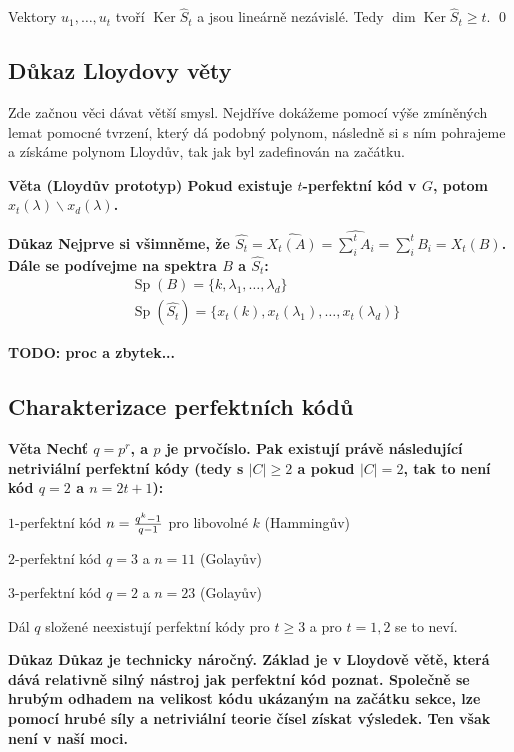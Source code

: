 \documentclass[a4paper,12pt,titlepage]{article}
\newcommand{\dk}{\smallskip\noindent\bf Důkaz\rm{} }
\newcommand{\vt}{\smallskip\noindent\bf Věta\rm{} }
\newcommand{\todo}[1]{\bf TODO: \rm#1}
\DeclareMathOperator{\Sp}{Sp}
\DeclareMathOperator{\Ker}{Ker}
\begin{document}
Vektory $u_1,\dots, u_t$ tvoří $\Ker \widehat S_t$ a jsou lineárně nezávislé. Tedy $\dim\Ker\widehat S_t \ge t$.
\qed

\subsection{Důkaz Lloydovy věty}

Zde začnou věci dávat větší smysl. Nejdříve dokážeme pomocí výše zmíněných lemat pomocné tvrzení, který dá podobný polynom, následně si s ním pohrajeme a získáme polynom Lloydův, tak jak byl zadefinován na začátku.

\vt (Lloydův prototyp) Pokud existuje $t$-perfektní kód v $G$, potom $x_t(\lambda)\backslash x_d(\lambda)$.

\dk Nejprve si všimněme, že $\widehat{S_t} = \widehat{X_t(A)} = \widehat{\sum_i^t A_i} = \sum_i^t B_i = X_t(B)$.
Dále se podívejme na spektra $B$ a $\widehat{S_t}$:
\begin{align}
	&\Sp(B) = \{ k, \lambda_1, \ldots, \lambda_d \} \\
	&\Sp(\widehat{S_t}) = \{ x_t(k), x_t(\lambda_1), \ldots, x_t(\lambda_d) \}
\end{align}

\todo{proc a zbytek...}


\subsection{Charakterizace perfektních kódů}

\vt Nechť $q=p^r$, a $p$ je prvočíslo. Pak existují právě následující netriviální perfektní kódy (tedy s $|C| \geq 2$ a pokud $|C| = 2$, tak to není kód $q=2$ a $n=2t+1$):
\begin{description}
	\item $1$-perfektní kód $n={q^k-1 \over q-1}$ pro libovolné $k$ (Hammingův)
	\item $2$-perfektní kód $q=3$ a $n=11$ (Golayův)
	\item $3$-perfektní kód $q=2$ a $n=23$ (Golayův)
\end{description}
Dál $q$ složené neexistují perfektní kódy pro $t \geq 3$ a pro $t = 1,2$ se to neví.

\dk Důkaz je technicky náročný. Základ je v Lloydově větě, která dává relativně silný nástroj jak perfektní kód poznat. Společně se hrubým odhadem na velikost kódu ukázaným na začátku sekce, lze pomocí hrubé síly a netriviální teorie čísel získat výsledek. Ten však není v naší moci.
\end{document}
